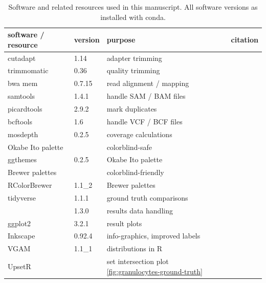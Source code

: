 \documentclass[authoryear,preprint,11pt]{scrartcl}
\begin{document}
\begin{center}
 \begin{table}[tbp]
  \caption{Software and related resources used in this manuscript. All software versions as installed with conda.}
  \label{tab:software-overview}
  \begin{tabular}{llll}
    \toprule
    software / resource & version   & purpose                       & citation \\
    \toprule
    cutadapt            & 1.14      & adapter trimming              & \citep{martin_cutadapt_2011} \\
    \midrule
    trimmomatic         & 0.36      & quality trimming              & \citep{bolger_trimmomatic_2014} \\
    \midrule
    bwa mem             & 0.7.15    & read alignment / mapping      & \citep{li_aligning_2013} \\
    \midrule
    samtools            & 1.4.1     & handle SAM / BAM files        & \citep{li_sequence_2009} \\
    \midrule
    picardtools         & 2.9.2     & mark duplicates               &  \\
    \midrule
    bcftools            & 1.6       & handle VCF / BCF files        & \citep{danecek_variant_2011} \\
    \midrule
    mosdepth            & 0.2.5     & coverage calculations         & \citep{pedersen_mosdepth_2018} \\
    \midrule
    Okabe Ito palette   &           & colorblind-safe               & \citep{okabe_color_2008} \\
    \midrule
    ggthemes            & 0.2.5     & Okabe Ito palette             & \citep{arnold_ggthemes_2019} \\
    \midrule
    Brewer palettes     &           & colorblind-friendly           & \citep{brewer_colorbrewer_2006} \\
    \midrule
    RColorBrewer        & 1.1\_2     & Brewer palettes              & \citep{neuwirth_rcolorbrewer_2014} \\
    \midrule
    tidyverse           & 1.1.1     & ground truth comparisons      & \citep{wickham_welcome_2019} \\
                        & 1.3.0     & results data handling         &  \\
    \midrule
    ggplot2             & 3.2.1     & result plots                  & \citep{wickham_ggplot2_2016} \\
    \midrule
    Inkscape            & 0.92.4    & info-graphics, improved labels & \\
    \midrule
    VGAM                & 1.1\_1     & distributions in R            & \citep{yee_vgam_2008,yee_vector_2015} \\
    \midrule
    UpsetR              &           & set intersection plot \ref{fig:granulocytes-ground-truth} & \citep{conway_upsetr_2017} \\
    \bottomrule
  \end{tabular}
 \end{table}
\end{center}




\end{document}
